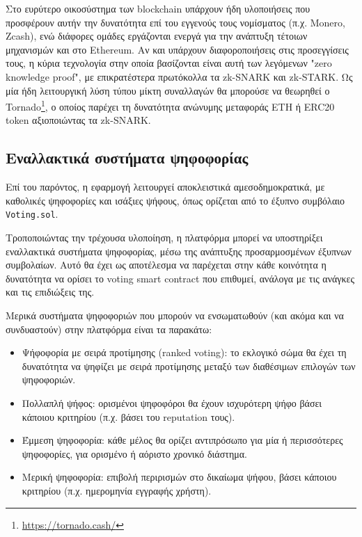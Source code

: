 Στο ευρύτερο οικοσύστημα των blockchain υπάρχουν ήδη υλοποιήσεις που προσφέρουν αυτήν την δυνατότητα επί του εγγενούς τους νομίσματος (π.χ. Monero, Zcash), ενώ διάφορες ομάδες εργάζονται ενεργά για την ανάπτυξη τέτοιων μηχανισμών και στο Ethereum. Αν και υπάρχουν διαφοροποιήσεις στις προσεγγίσεις τους, η κύρια τεχνολογία στην οποία βασίζονται είναι αυτή των λεγόμενων "zero knowledge proof", με επικρατέστερα πρωτόκολλα τα zk-SNARK και zk-STARK. Ως μία ήδη λειτουργική λύση τύπου μίκτη συναλλαγών θα μπορούσε να θεωρηθεί ο Tornado\footnote{\url{https://tornado.cash/}}, ο οποίος παρέχει τη δυνατότητα ανώνυμης μεταφοράς ETH ή ERC20 token αξιοποιώντας τα zk-SNARK.\cite{5.2-privacy-on-ethereum}

\subsection{Εναλλακτικά συστήματα ψηφοφορίας}\label{subsection:5-2-3-alternative-voting-systems}

Επί του παρόντος, η εφαρμογή λειτουργεί αποκλειστικά αμεσοδημοκρατικά, με καθολικές ψηφοφορίες και ισάξιες ψήφους, όπως ορίζεται από το έξυπνο συμβόλαιο \texttt{Voting.sol}.

Τροποποιώντας την τρέχουσα υλοποίηση, η πλατφόρμα μπορεί να υποστηρίξει εναλλακτικά συστήματα ψηφοφορίας, μέσω της ανάπτυξης προσαρμοσμένων έξυπνων συμβολαίων. Αυτό θα έχει ως αποτέλεσμα να παρέχεται στην κάθε κοινότητα η δυνατότητα να ορίσει το voting smart contract που επιθυμεί, ανάλογα με τις ανάγκες και τις επιδιώξεις της.

Μερικά συστήματα ψηφοφοριών που μπορούν να ενσωματωθούν (και ακόμα και να συνδυαστούν) στην πλατφόρμα είναι τα παρακάτω:

\begin{itemize}
	\item Ψήφοφορία με σειρά προτίμησης (ranked voting): το εκλογικό σώμα θα έχει τη δυνατότητα να ψηφίζει με σειρά προτίμησης μεταξύ των διαθέσιμων επιλογών των ψηφοφοριών.
	\item Πολλαπλή ψήφος: ορισμένοι ψηφοφόροι θα έχουν ισχυρότερη ψήφο βάσει κάποιου κριτηρίου (π.χ. βάσει του reputation τους).
	\item Έμμεση ψηφοφορία: κάθε μέλος θα ορίζει αντιπρόσωπο για μία ή περισσότερες ψηφοφορίες, για ορισμένο ή αόριστο χρονικό διάστημα.
	\item Μερική ψηφοφορία: επιβολή περιρισμών στο δικαίωμα ψήφου, βάσει κάποιου κριτηρίου (π.χ. ημερομηνία εγγραφής χρήστη).
\end{itemize}

